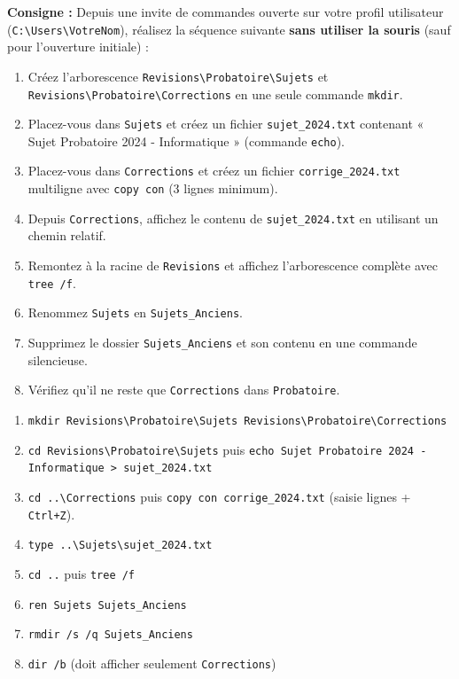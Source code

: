 \documentclass[11pt]{article}
\begin{document}
\begin{exercice}
\textbf{Consigne :} Depuis une invite de commandes ouverte sur votre profil utilisateur (\texttt{C:\textbackslash Users\textbackslash VotreNom}), réalisez la séquence suivante \textbf{sans utiliser la souris} (sauf pour l'ouverture initiale) :
\begin{enumerate}
    \item Créez l'arborescence \texttt{Revisions\textbackslash Probatoire\textbackslash Sujets} et \texttt{Revisions\textbackslash Probatoire\textbackslash Corrections} en une seule commande \texttt{mkdir}.
    \item Placez-vous dans \texttt{Sujets} et créez un fichier \texttt{sujet\_2024.txt} contenant « Sujet Probatoire 2024 - Informatique » (commande \texttt{echo}).
    \item Placez-vous dans \texttt{Corrections} et créez un fichier \texttt{corrige\_2024.txt} multiligne avec \texttt{copy con} (3 lignes minimum).
    \item Depuis \texttt{Corrections}, affichez le contenu de \texttt{sujet\_2024.txt} en utilisant un chemin relatif.
    \item Remontez à la racine de \texttt{Revisions} et affichez l'arborescence complète avec \texttt{tree /f}.
    \item Renommez \texttt{Sujets} en \texttt{Sujets\_Anciens}.
    \item Supprimez le dossier \texttt{Sujets\_Anciens} et son contenu en une commande silencieuse.
    \item Vérifiez qu'il ne reste que \texttt{Corrections} dans \texttt{Probatoire}.
\end{enumerate}
\end{exercice}

\begin{corrige}
\begin{enumerate}
    \item \texttt{mkdir Revisions\textbackslash Probatoire\textbackslash Sujets Revisions\textbackslash Probatoire\textbackslash Corrections}
    \item \texttt{cd Revisions\textbackslash Probatoire\textbackslash Sujets} puis \texttt{echo Sujet Probatoire 2024 - Informatique > sujet\_2024.txt}
    \item \texttt{cd ..\textbackslash Corrections} puis \texttt{copy con corrige\_2024.txt} (saisie lignes + \texttt{Ctrl+Z}).
    \item \texttt{type ..\textbackslash Sujets\textbackslash sujet\_2024.txt}
    \item \texttt{cd ..} puis \texttt{tree /f}
    \item \texttt{ren Sujets Sujets\_Anciens}
    \item \texttt{rmdir /s /q Sujets\_Anciens}
    \item \texttt{dir /b} (doit afficher seulement \texttt{Corrections})
\end{enumerate}
\end{corrige}
\end{document}
